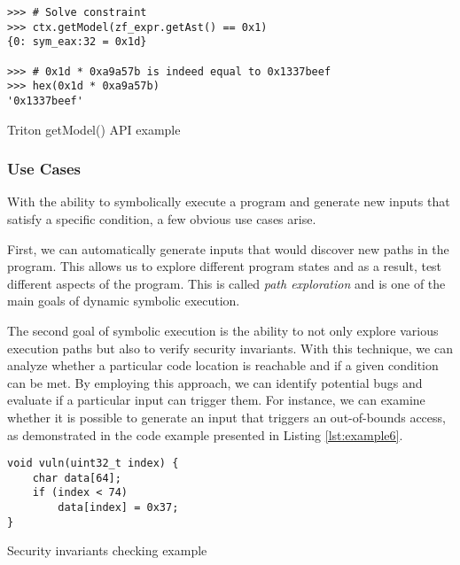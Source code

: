 \begin{listing}[htp]
	\centering
	\begin{minipage}{.7\linewidth}
		\begin{verbatim}
>>> # Solve constraint
>>> ctx.getModel(zf_expr.getAst() == 0x1)
{0: sym_eax:32 = 0x1d}

>>> # 0x1d * 0xa9a57b is indeed equal to 0x1337beef
>>> hex(0x1d * 0xa9a57b)
'0x1337beef'
\end{verbatim}
	\end{minipage}
	\caption{Triton getModel() API example}
	\label{lst:example5}
\end{listing}

\subsubsection{Use Cases}

With the ability to symbolically execute a program and generate new inputs that satisfy a specific condition, a few obvious use cases arise.

First, we can automatically generate inputs that would discover new paths in the program. This allows us to explore different program states and as a result, test different aspects of the program. This is called \textit{path exploration} and is one of the main goals of dynamic symbolic execution.

The second goal of symbolic execution is the ability to not only explore various execution paths but also to verify security invariants. With this technique, we can analyze whether a particular code location is reachable and if a given condition can be met. By employing this approach, we can identify potential bugs and evaluate if a particular input can trigger them. For instance, we can examine whether it is possible to generate an input that triggers an out-of-bounds access, as demonstrated in the code example presented in Listing \ref{lst:example6}.

\begin{listing}[htp]
	\centering
	\begin{minipage}{.4\linewidth}
		\begin{verbatim}
void vuln(uint32_t index) {
	char data[64];
	if (index < 74)
		data[index] = 0x37;
}
		\end{verbatim}
	\end{minipage}
	\caption{Security invariants checking example}
	\label{lst:example6}
\end{listing}


